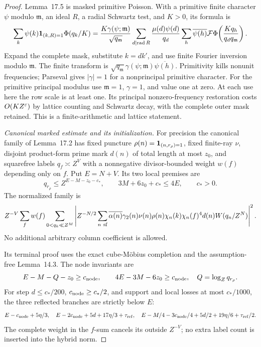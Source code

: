 \begin{proof}
Lemma~17.5 is masked primitive Poisson. With a primitive finite character $\psi$ modulo $\mathfrak m$, an ideal $R$, a radial Schwartz test, and $K>0$, its formula is
\[
 \sum_k\psi(k)\mathbf 1_{(k,R)=1}\Phi(q_k/K)
 =\frac{K\gamma(\psi;\mathfrak m)}{\sqrt{q_{\mathfrak m}}}
   \sum_{d\mid\operatorname{rad} R}\frac{\mu(d)\psi(d)}{q_d}
   \sum_h\overline{\psi(h)}
          \mathcal F\Phi\!\left(\frac{Kq_h}{q_dq_{\mathfrak m}}\right).
\]
Expand the complete mask, substitute $k=dk'$, and use finite Fourier inversion modulo $\mathfrak m$. The finite transform is $\sqrt{q_{\mathfrak m}}\gamma(\psi;\mathfrak m)\overline{\psi(h)}$. Primitivity kills nonunit frequencies; Parseval gives $|\gamma|=1$ for a nonprincipal primitive character. For the primitive principal modulus use $\mathfrak m=1$, $\gamma=1$, and value one at zero. At each use here the row scale is at least one. Its principal nonzero-frequency restoration costs $O(KZ^\varepsilon)$ by lattice counting and Schwartz decay, with the complete outer mask retained. This is a finite-arithmetic and lattice statement.

\emph{Canonical marked estimate and its initialization.}
For precision the canonical family of Lemma~17.2 has fixed puncture $\rho(n)=\mathbf 1_{(n,r_\rho)=1}$, fixed finite-ray $\nu$, disjoint product-form prime mark $d(n)$ of total length at most $z_0$, and squarefree labels $q_f\asymp Z^V$ with a nonnegative divisor-bounded weight $w(f)$ depending only on $f$. Put $E=N+V$. Its two local premises are
\[
 q_{r_\rho}\le Z^{E-M-z_0-c_*},\qquad
 3M+6z_0+c_*\le4E,\qquad c_*>0.
\]
The normalized family is
\[
 Z^{-V}\sum_f w(f)\sum_{0<q_k\ll Z^M}
 \left|Z^{-N/2}\sum_{n\ \mathrm{sf}}
       \overline{\alpha(n)}\gamma_2(n)\nu(n)\rho(n)
       \chi_n(k)\chi_n(f)^4d(n)W(q_n/Z^N)\right|^2.
\]
No additional arbitrary column coefficient is allowed.

Its terminal proof uses the exact cube-Möbius completion  and the assumption-free Lemma~14.3. The node invariants are
\[
 E-M-Q-z_0\ge c_{\rm node},\qquad4E-3M-6z_0\ge c_{\rm node},
 \quad Q=\log_Zq_{r_\rho}.
\]
For step $d\le c_*/200$, $c_{\rm node}\ge c_*/2$, and support and local losses at most $c_*/1000$, the three reflected branches  are strictly below $E$:
\[
 E-c_{\rm node}+5\eta/3,\quad
 E-2c_{\rm node}+5d+17\eta/3+\tau_{\rm ref},\quad
 E-M/4-3c_{\rm node}/4+5d/2+19\eta/6+\tau_{\rm ref}/2.
\]
The complete weight in the $f$-sum cancels its outside $Z^{-V}$; no extra label count is inserted into the hybrid norm.


\end{proof}
